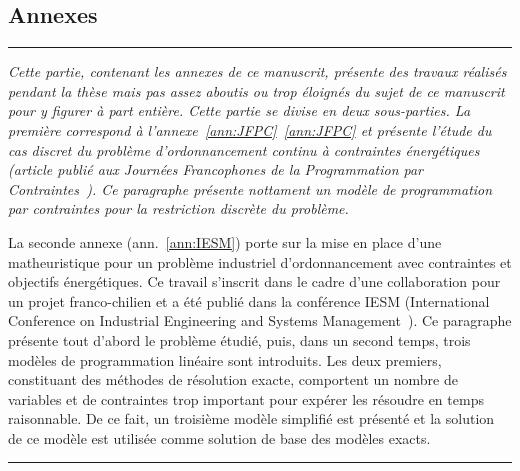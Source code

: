\cleardoublepage
{}
\begin{center}
  \begin{minipage}{\textwidth}
  \part*{Annexes}
\end{minipage}
\end{center}

\newpage
\thispagestyle{empty}
\begin{center}
  \begin{minipage}{\textwidth}
    \hrule
    \vspace{0.5cm}
    {\it  Cette partie, contenant les annexes de ce manuscrit, présente des
      travaux réalisés pendant la thèse mais pas assez aboutis ou trop
      éloignés du sujet de ce manuscrit pour y figurer à part
      entière. Cette partie se divise en deux sous-parties. La
      première correspond à l'annexe~\ref{ann:JFPC}~\ref{ann:JFPC} et
      présente l'étude du cas discret du problème d'ordonnancement
      continu à contraintes énergétiques (article publié aux
      Journées Francophones de la Programmation par
      Contraintes~\cite{Nattaf_JFPC}). Ce paragraphe présente
      nottament un modèle de programmation par contraintes pour la
      restriction discrète du problème.

      La seconde annexe (ann.~\ref{ann:IESM}) porte sur la mise en place d'une
      matheuristique pour un problème industriel d'ordonnancement avec
      contraintes et objectifs énergétiques. Ce travail s'inscrit dans
      le cadre d'une collaboration pour un projet franco-chilien et a
      été publié dans la conférence IESM (International Conference on
      Industrial Engineering and Systems
      Management~\cite{Nattaf_IESM}). Ce paragraphe présente tout
      d'abord le problème étudié, puis, dans un second temps, trois
      modèles de programmation linéaire sont introduits. Les deux
      premiers, constituant des méthodes de résolution exacte,
      comportent un nombre de variables et de contraintes trop
      important pour expérer les résoudre en temps raisonnable. De ce
      fait, un troisième modèle simplifié est présenté et la solution
      de ce modèle est utilisée comme solution de base des modèles
      exacts.}   
    \vspace{0.5cm}
    \hrule
  \end{minipage}
\end{center}



